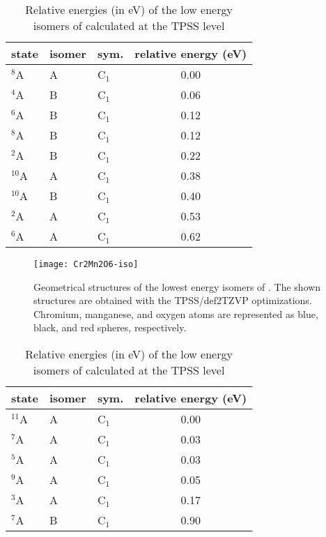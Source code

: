 \begin{table}[]
	\centering
	\caption{Relative energies (in eV) of the low energy isomers of  calculated at the TPSS level}
	\begin{tabular}{@{}lllc@{}}
	\toprule
	state & isomer & sym. & relative energy (eV) \\ \midrule
	$^8$A      & A      & C$_1$   & 0.00                 \\
	$^4$A      & B      & C$_1$   & 0.06                 \\
	$^6$A      & B      & C$_1$   & 0.12                 \\
	$^8$A      & B      & C$_1$   & 0.12                 \\
	$^2$A      & B      & C$_1$   & 0.22                 \\
	$^{10}$A   & A      & C$_1$   & 0.38                 \\
	$^{10}$A   & B      & C$_1$   & 0.40                 \\
	$^2$A      & A      & C$_1$   & 0.53                 \\
	$^6$A      & A      & C$_1$   & 0.62                 \\ \bottomrule
	\end{tabular}
\end{table}



\begin{figure}
	\centering
	\texttt{[image: Cr2Mn2O6-iso]}
	\caption{Geometrical structures of the lowest energy isomers of . The shown structures are obtained with the TPSS/def2TZVP optimizations. Chromium, manganese, and oxygen atoms are represented as blue, black, and red spheres, respectively.}
	\label{figs:Cr2Mn2O6}
\end{figure}









\begin{table}[]
	\centering
	\caption{Relative energies (in eV) of the low energy isomers of  calculated at the TPSS level}
	\begin{tabular}{@{}lllc@{}}
	\toprule
	state & isomer & sym. & relative energy (eV) \\ \midrule
	$^{11}$A   & A      & C$_1$   & 0.00                 \\
	$^7$A      & A      & C$_1$   & 0.03                 \\
	$^5$A      & A      & C$_1$   & 0.03                 \\
	$^9$A      & A      & C$_1$   & 0.05                 \\
	$^3$A      & A      & C$_1$   & 0.17                 \\
	$^7$A      & B      & C$_1$   & 0.90                 \\ \bottomrule
	\end{tabular}
\end{table}


